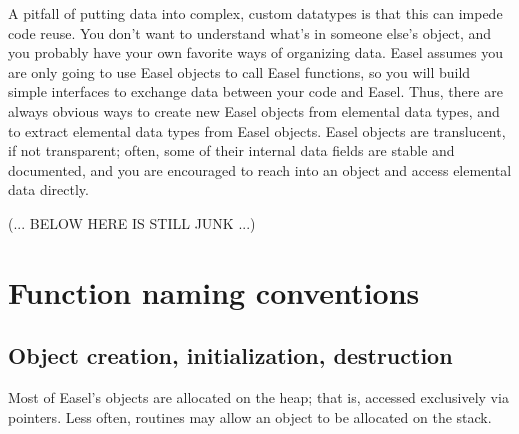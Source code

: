 A pitfall of putting data into complex, custom datatypes is that this
can impede code reuse. You don't want to understand what's in someone
else's object, and you probably have your own favorite ways of
organizing data.  Easel assumes you are only going to use Easel
objects to call Easel functions, so you will build simple interfaces
to exchange data between your code and Easel. Thus, there are always
obvious ways to create new Easel objects from elemental data types,
and to extract elemental data types from Easel objects. Easel objects
are translucent, if not transparent; often, some of their internal
data fields are stable and documented, and you are encouraged to reach
into an object and access elemental data directly.





(... BELOW HERE IS STILL JUNK ...)



\section{Function naming conventions}

\subsection{Object creation, initialization, destruction}

Most of Easel's objects are allocated on the heap; that is, accessed
exclusively via pointers. Less often, routines may allow an object to
be allocated on the stack.

